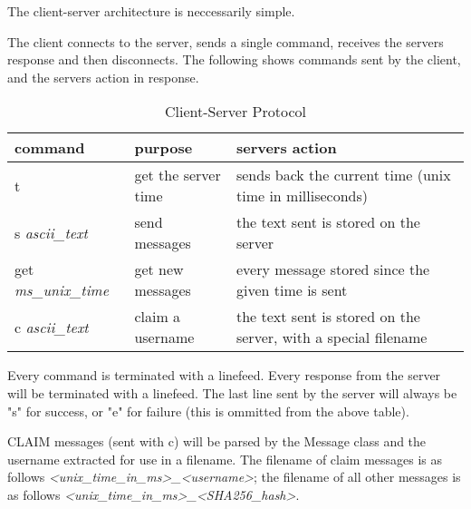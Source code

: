 The client-server architecture is neccessarily simple.

The client connects to the server, sends a single command, receives the servers
response and then disconnects. The following shows commands sent by the client,
and the servers action in response.

\begin{table}[h]
    \centering
    \begin{tabular}{lll}
    command                     & purpose             & servers action\\ \hline
    t                           & get the server time & sends back the current time (unix time in milliseconds)\\
    s   \textit{ascii\_text}    & send messages       & the text sent is stored on the server\\
    get \textit{ms\_unix\_time} & get new messages    & every message stored since the given time is sent\\
    c   \textit{ascii\_text}    & claim a username    & the text sent is stored on the server, with a special filename\\
    \end{tabular}
    \caption{Client-Server Protocol}
\end{table}

Every command is terminated with a linefeed. Every response from the server will
be terminated with a linefeed. The last line sent by the server will always be
"s" for success, or "e" for failure (this is ommitted from the above table).

CLAIM messages (sent with c) will be parsed by the Message class and the
username extracted for use in a filename. The filename of claim messages is as
follows
\textit{\textless unix\_time\_in\_ms\textgreater \_\textless username\textgreater};
the filename of all other messages is as follows
\textit{\textless unix\_time\_in\_ms\textgreater \_\textless SHA256\_hash\textgreater}.

